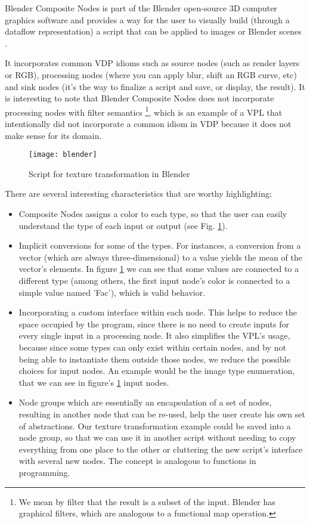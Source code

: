 \begin{itemsize}
Blender Composite Nodes is part of the Blender open-source 3D computer graphics
software and provides a way for the user to visually build (through a dataflow
representation) a script that can be applied to images or Blender scenes \cite{blender}.

It incorporates common VDP idioms such as source nodes (such as render layers or
RGB), processing nodes (where you can apply blur, shift an RGB curve, etc) and
sink nodes (it's the way to finalize a script and save, or display, the result).
It is interesting to note that
Blender Composite Nodes does not incorporate processing nodes with filter semantics
\footnote{We mean by filter that the result is a subset of the input. Blender has
graphical filters, which are analogous to a functional map operation.},
which is an example of a VPL that intentionally did not incorporate a common
idiom in VDP because it does not make sense for its domain.

\begin{figure}[t]
  \begin{center}
    \leavevmode
    \texttt{[image: blender]}
    \caption{Script for texture transformation in Blender \cite{blender}}
    \label{fig:blender}
  \end{center}
\end{figure}

There are several interesting characteristics that are worthy highlighting:
\begin{itemize}
  \item Composite Nodes assigns a color to each type, so that the user can
easily understand the type of each input or output (see Fig. \ref{fig:blender}).
  \item Implicit conversions for some of the types. For instances,
a conversion from a vector (which are always three-dimensional) to a value yields
the mean of the vector's elements. In figure \ref{fig:blender} we can see that
some values are connected to a different type (among others, the first input
node's color is connected to a simple value named 'Fac'), which is valid behavior.
  \item Incorporating a custom interface within each node. This helps to reduce
the space occupied by the program, since there is no need to create inputs for
every single input in a processing node. It also simplifies the VPL's usage,
because since some types can only exist within certain nodes, and by not being
able to instantiate them outside those nodes, we reduce the possible choices
for input nodes. An example would be the image type enumeration, that we can
see in figure's \ref{fig:blender} input nodes.
  \item Node groups which are essentially an encapsulation
of a set of nodes, resulting in another node that can be re-used, help the user
create his own set of abstractions. Our texture transformation example could
be saved into a node group, so that we can use it in another script without
needing to copy everything from one place to the other or cluttering the new
script's interface with several new nodes. The concept is analogous to functions
in programming.
\end{itemize}


\end{itemsize}
